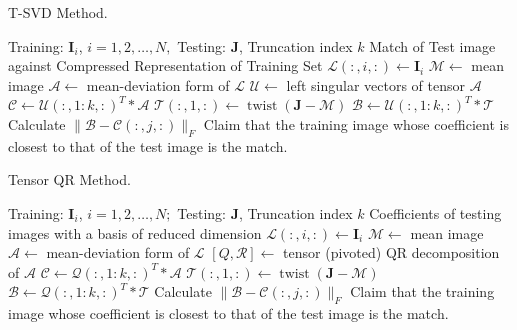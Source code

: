 \documentclass[english]{article}
\newcommand{\<}{\langle}
\renewcommand{\>}{\rangle}
\theoremstyle{definition}
\begin{document}
\begin{algorithm}  
	\caption{T-SVD Method.}
	\begin{algorithmic} 
		\Require  
		Training:  $\mathbf{I}_{i}$, $i=1,2, \ldots, N, $ Testing: $ \mathbf{J}$,  Truncation index $ k $
		\Ensure  
		Match of Test image against Compressed Representation of Training Set  
		\State  $\mathcal{L}(:, i,:) \leftarrow \mathbf{I}_{i}$
		\EndFor
		\State $ \mathcal{M} \leftarrow $ mean image
		\State $ \mathcal{A} \leftarrow $ mean-deviation form of $ \mathcal{L}  $
		\State $ \mathcal{U} \leftarrow $ left singular vectors of tensor $ \mathcal{A} $
		\State $ \mathcal{C} \leftarrow \mathcal{U}(:, 1: k,:)^{T} * \mathcal{A} $
		\State $ \mathcal{T}(:, 1,:) \leftarrow \operatorname{twist}(\mathbf{J}-\mathcal{M})  $
		\State $ \mathcal{B} \leftarrow \mathcal{U}(:, 1: k,:)^{T} * \mathcal{T} $
		\State Calculate $ \|\mathcal{B}-\mathcal{C}(:, j,:)\|_{F} $
		\EndFor
		\State Claim that the training image whose coefficient is closest to that of the test image is the match. 
	\end{algorithmic}
\end{algorithm}

\begin{algorithm}  
	\caption{Tensor QR Method.}
	\begin{algorithmic} 
		\Require  
		Training:  $\mathbf{I}_{i}$, $i=1,2, \ldots, N; $ Testing: $ \mathbf{J}$,  Truncation index $ k $
		\Ensure  
		Coefficients of testing images with a basis of reduced dimension  
		\For  {$i=1 \quad to \quad N $}
		\State  $\mathcal{L}(:, i,:) \leftarrow \mathbf{I}_{i}$
		\EndFor
		\State $ \mathcal{M} \leftarrow $ mean image
		\State $ \mathcal{A} \leftarrow $ mean-deviation form of $ \mathcal{L}  $
		\State $ [Q, \mathcal{R}] \leftarrow $ tensor (pivoted) QR decomposition of $ \mathcal{A}  $
		\State $ \mathcal{C} \leftarrow \mathcal{Q}(:, 1: k,:)^{T} * \mathcal{A} $
		\State $ \mathcal{T}(:, 1,:) \leftarrow \operatorname{twist}(\mathbf{J}-\mathcal{M}) $
		\State $ \mathcal{B} \leftarrow \mathcal{Q}(:, 1: k,:)^{T} * \mathcal{T} $
		\For  {$j=1\quad to \quad N $}
		\State Calculate $ \|\mathcal{B}-\mathcal{C}(:, j,:)\|_{F} $
		\EndFor
		\State Claim that the training image whose coefficient is closest to that of the test image is the match. 
	\end{algorithmic}
\end{algorithm}
\end{document}

